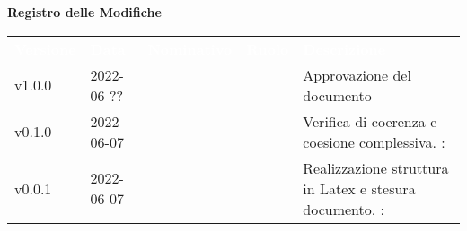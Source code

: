 

{\LARGE{\textbf{Registro delle Modifiche}}} \\
\begin{table}[!htbp]
	\renewcommand{\arraystretch}{1.5}
	\begin{tabular}{ m{}<{\centering}  m{}<{\centering}  m{}<{\centering}  m{}<{\centering}  m{}<{\centering} }
		\rowcolor{darkblue}
		\textcolor{white}{\textbf{Versione}} & \textcolor{white}{\textbf{Data}} & \textcolor{white}{\textbf{Nominativo}} & \textcolor{white}{\textbf{Ruolo}} & \textcolor{white}{\textbf{Descrizione}}                              \\
		v1.0.0                               & 2022-06-??                  & \FP                                       & \RE                               & Approvazione del documento                                           \\

		v0.1.0                               & 2022-06-07                      & \PV                                    & \AN                               & Verifica di coerenza e coesione complessiva. \VE: \textit{}          \\

		v0.0.1                               & 2022-06-07                       & \PV                                    & \AN                               & Realizzazione struttura in Latex e stesura documento. \VE: \textit{} \\
	\end{tabular}
\end{table}

\pagebreak